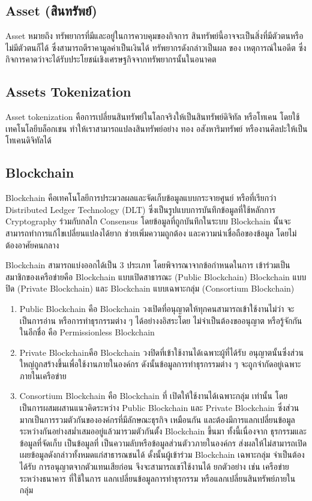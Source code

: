 \documentclass[12pt,oneside,openright,a4paper]{cpe-thai-project}
\begin{document}
\subsection{Asset (สินทรัพย์)  \cite{asset}}
\tab Asset หมายถึง ทรัพยากรที่มีและอยู่ในการควบคุมของกิจการ สินทรัพย์นี้อาจจะเป็นสิ่งที่มีตัวตนหรือไม่มีตัวตนก็ได้ ซึ่งสามารถตีราคามูลค่าเป็นเงินได้ ทรัพยากรดังกล่าวเป็นผล ของ เหตุการณ์ในอดีต ซึ่งกิจการคาดว่าจะได้รับประโยชน์เชิงเศรษฐกิจจากทรัพยากรนั้นในอนาคต

\subsection{Assets Tokenization  \cite{tokenization}}
\tab Asset tokenization คือการเปลี่ยนสินทรัพย์ในโลกจริงให้เป็นสินทรัพย์ดิจิทัล หรือโทเคน โดยใช้เทคโนโลยีบล็อกเชน ทำให้เราสามารถแปลงสินทรัพย์อย่าง ทอง อสังหาริมทรัพย์ หรืองานศิลปะให้เป็นโทเคนดิจิทัลได้

\subsection{Blockchain \cite{blockchain}} 
\tab Blockchain คือเทคโนโลยีการประมวลผลและจัดเก็บข้อมูลแบบกระจายศูนย์ หรือที่เรียกว่า Distributed Ledger Technology (DLT) ซึ่งเป็นรูปแบบการบันทึกข้อมูลที่ใช้หลักการ Cryptography ร่วมกับกลไก Consensus โดยข้อมูลที่ถูกบันทึกในระบบ Blockchain นั้นจะสามารถทำการแก้ไขเปลี่ยนแปลงได้ยาก ช่วยเพิ่มความถูกต้อง และความน่าเชื่อถือของข้อมูล โดยไม่ต้องอาศัยคนกลาง

\tab Blockchain สามารถแบ่งออกได้เป็น 3 ประเภท โดยพิจารณาจากข้อกำหนดในการ เข้าร่วมเป็นสมาชิกของเครือข่ายคือ Blockchain แบบเปิดสาธารณะ (Public Blockchain) Blockchain แบบปิด (Private Blockchain) และ Blockchain แบบเฉพาะกลุ่ม (Consortium Blockchain) 
\begin{enumerate}[label=\thesubsection.\arabic*,leftmargin=0pt,itemindent=2cm]
\item Public Blockchain คือ Blockchain วงเปิดที่อนุญาตให้ทุกคนสามารถเข้าใช้งานไม่ว่า จะเป็นการอ่าน หรือการทำธุรกรรมต่าง ๆ ได้อย่างงอิสระโดย ไม่จำเป็นต้องขออนุญาต หรือรู้จักกันในอีกชื่อ คือ Permissionless Blockchain
\item Private Blockchainคือ Blockchain วงปิดที่เข้าใช้งานได้เฉพาะผู้ที่ได้รับ อนุญาตนั้นซึ่งส่วนใหญ่ถูกสร้างขึ้นเพื่อใช้งานภายในองค์กร ดังนั้นข้อมูลการทำธุรกรรมต่าง ๆ จะถูกจํากัดอยู่เฉพาะภายในเครือข่าย
\item Consortium Blockchain คือ Blockchain ที่ เปิดให้ใช้งานได้เฉพาะกลุ่ม เท่านั้น โดยเป็นการผสมผสานแนวคิดระหว่าง Public Blockchain และ Private Blockchain ซึ่งส่วนมากเป็นการรวมตัวกันขององค์กรที่มีลักษณะธุรกิจ เหมือนกัน และต้องมีการแลกเปลี่ยนข้อมูลระหว่างกันอย่างสม่ำเสมออยู่แล้วมารวมตัวกันตั้ง Blockchain ขึ้นมา ทั้งนี้เนื่องจาก ธุรกรรมและข้อมูลที่จัดเก็บ เป็นข้อมูลที่ เป็นความลับหรือข้อมูลส่วนตัววภายในองค์กร ส่งผลให้ไม่สามารถเปิดเผยข้อมูลดังกล่าวทั้งหมดแก่สาธารณชนได้ ดั้งนั้นผู้เข้าร่วม Blockchain เฉพาะกลุ่ม จำเป็นต้องได้รับ การอนุญาตจากตัวแทนเสียก่อน จึงจะสามารถเขา้ใช้งานได้ ยกตัวอย่าง เช่น เครือข่ายระหว่างธนาคาร ที่ใช้ในการ แลกเปลี่ยนข้อมูลการทำธุรกรรม หรือแลกเปลี่ยนสินทรัพย์ภายในกลุ่ม
\end{enumerate}
\end{document}
